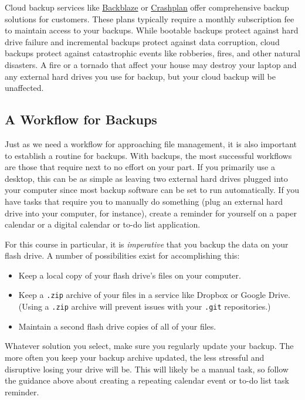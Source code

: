 \documentclass[]{book}
\providecommand{\tightlist}{%
  \setlength{\itemsep}{0pt}\setlength{\parskip}{0pt}}
\theoremstyle{definition}
\theoremstyle{definition}
\theoremstyle{remark}
\begin{document}
Cloud backup services like \href{https://www.backblaze.com}{Backblaze}
or \href{https://www.code42.com/crashplan/}{Crashplan} offer
comprehensive backup solutions for customers. These plans typically
require a monthly subscription fee to maintain access to your backups.
While bootable backups protect against hard drive failure and
incremental backups protect against data corruption, cloud backups
protect against catastrophic events like robberies, fires, and other
natural disasters. A fire or a tornado that affect your house may
destroy your laptop and any external hard drives you use for backup, but
your cloud backup will be unaffected.

\subsection{A Workflow for Backups}\label{a-workflow-for-backups}

Just as we need a workflow for approaching file management, it is also
important to establish a routine for backups. With backups, the most
successful workflows are those that require next to no effort on your
part. If you primarily use a desktop, this can be as simple as leaving
two external hard drives plugged into your computer since most backup
software can be set to run automatically. If you have tasks that require
you to manually do something (plug an external hard drive into your
computer, for instance), create a reminder for yourself on a paper
calendar or a digital calendar or to-do list application.

For this course in particular, it is \emph{imperative} that you backup
the data on your flash drive. A number of possibilities exist for
accomplishing this:

\begin{itemize}
\tightlist
\item
  Keep a local copy of your flash drive's files on your computer.
\item
  Keep a \texttt{.zip} archive of your files in a service like Dropbox
  or Google Drive. (Using a \texttt{.zip} archive will prevent issues
  with your \texttt{.git} repositories.)
\item
  Maintain a second flash drive copies of all of your files.
\end{itemize}

Whatever solution you select, make sure you regularly update your
backup. The more often you keep your backup archive updated, the less
stressful and disruptive losing your drive will be. This will likely be
a manual task, so follow the guidance above about creating a repeating
calendar event or to-do list task reminder.
\end{document}
